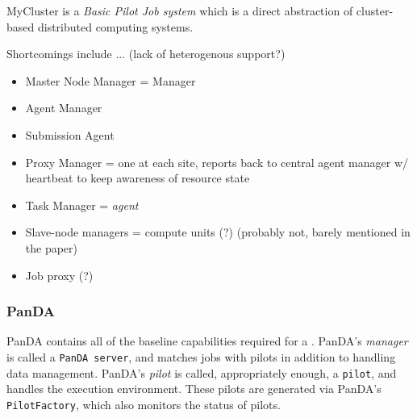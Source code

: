 \documentclass{sig-alternate}
\begin{document}
MyCluster is a \textit{Basic Pilot Job system} which is a direct
abstraction of cluster-based distributed computing systems.


Shortcomings include ...  (lack of heterogenous support?)


\begin{itemize}
\item Master Node Manager = Manager 
\item Agent Manager 
\item Submission Agent
\item Proxy Manager = one at each site, reports back to central
  agent manager w/ heartbeat to keep awareness of resource state
\item Task Manager = \textit{agent}
\item Slave-node managers = compute units (?) (probably not,
  barely mentioned in the paper)
\item Job proxy (?)
\end{itemize}


%
\subsubsection{PanDA}
PanDA contains all of the baseline capabilities required for a \pilotjob.
PanDA's \textit{manager} is called a \texttt{PanDA server}, and matches
jobs with pilots in addition to handling data management.  PanDA's \textit{pilot}
is called, appropriately enough, a \texttt{pilot}, and handles the execution
environment.  These pilots are generated via PanDA's \texttt{PilotFactory},
which also monitors the status of pilots.
\end{document}
